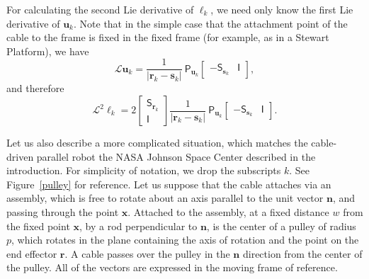 \documentclass[reqno,12pt]{amsart}
\newcommand\starop[1]{\mathsf S_{#1}}
\begin{document}
For calculating the second Lie derivative of $\ell_k$, we need only know the first Lie derivative of $\bm u_k$.  Note that in the simple case that the attachment point of the cable to the frame is fixed in the fixed frame (for example, as in a Stewart Platform), we have
\begin{equation}
\label{L u_k - fixed}
\mathcal L \bm u_k =
\frac1{|\bm r_k - \bm s_k|} \ 
\mathsf P_{\bm u_k}
\begin{bmatrix} - \starop{\bm s_k} & \mathsf I
\end{bmatrix} ,
\end{equation}
and therefore
\begin{equation}
\label{L^2 ell_k - fixed}
\mathcal L^2 \ell_k =
2 \begin{bmatrix} \starop{\bm r_k} \\ \mathsf I \end{bmatrix}
\frac1{|\bm r_k - \bm s_k|} \ 
\mathsf P_{\bm u_k}
\begin{bmatrix} - \starop{\bm s_k} & \mathsf I
\end{bmatrix} .
\end{equation}

Let us also describe a more complicated situation, which matches the cable-driven parallel robot the NASA Johnson Space Center described in the introduction.  For simplicity of notation, we drop the subscripts $k$.  See Figure~\ref{pulley} for reference.  Let us suppose that the cable attaches via an assembly, which is free to rotate about an axis parallel to the unit vector $\bm n$, and passing through the point $\bm x$.  Attached to the assembly, at a fixed distance $w$ from the fixed point $\bm x$, by a rod perpendicular to $\bm n$, is the center of a pulley of radius $p$, which rotates in the plane containing the axis of rotation and the point on the end effector $\bm r$.  A cable passes over the pulley in the $\bm n$ direction from the center of the pulley.  All of the vectors are expressed in the moving frame of reference.
\end{document}
